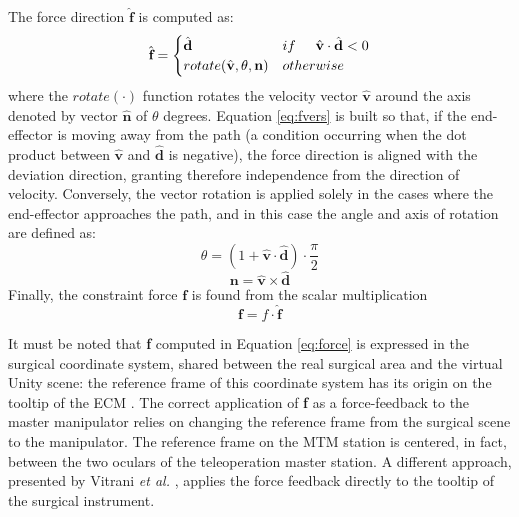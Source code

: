 \documentclass[conference]{IEEEtran}
\newcommand{\vers}[1]{\hat{\textbf{#1}}}
\newcommand{\vect}[1]{\textbf{#1}}
\begin{document}
The force direction $\hat{\textbf{f}}$ is computed as:
\begin{equation}
    \vers{f} = \begin{cases}
        \vers{d} & if \hspace{0.5cm}\vers{v}\cdot\vers{d}<0\\
        rotate(\vers{v},\theta,\vect{n}) & otherwise
        \label{eq:fvers}
    \end{cases}
\end{equation}
where the $rotate(\cdot)$ function rotates the velocity vector $\hat{\textbf{v}}$ around the axis denoted by vector $\hat{\textbf{n}}$ of $\theta$ degrees. Equation \ref{eq:fvers} is built so that, if the end-effector is moving away from the path (a condition occurring when the dot product between $\vers{v}$ and $\vers{d}$ is negative), the force direction is aligned with the deviation direction, granting therefore independence from the direction of velocity. Conversely, the vector rotation is applied solely in the cases where the end-effector approaches the path, and in this case the angle and axis of rotation are defined as:
\begin{equation}
    \theta = (1+\vers{v}\cdot\vers{d})\cdot\frac{\pi}{2}
\end{equation}
\begin{equation}
    \vect{n} = \vers{v}\times\vers{d}
\end{equation}
Finally, the constraint force $\vect{f}$ is found from the scalar multiplication
\begin{equation}
    \vect{f} = f\cdot\vers{f}
    \label{eq:force}
\end{equation}

It must be noted that \vect{f} computed in Equation \ref{eq:force} is expressed in the surgical coordinate system, shared between the real surgical area and the virtual Unity scene: the reference frame of this coordinate system has its origin on the tooltip of the ECM \cite{ref_frames}. The correct application of \vect{f} as a force-feedback to the master manipulator relies on changing the reference frame from the surgical scene to the manipulator. The reference frame on the MTM station is centered, in fact, between the two oculars of the teleoperation master station.
A different approach, presented by Vitrani \textit{et al.} \cite{vitrani2016applying}, applies the force feedback directly to the tooltip of the surgical instrument.
\end{document}
